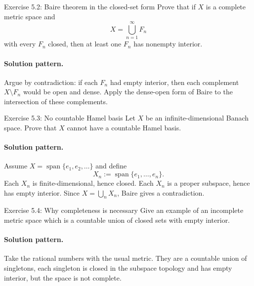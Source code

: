 \documentclass[header={Lecture 5 Exam Study Notes}]{study-note}
\begin{document}
\begin{exbox}{Exercise 5.2: Baire theorem in the closed-set form}
Prove that if $X$ is a complete metric space and
\[
X=\bigcup_{n=1}^{\infty}F_n
\]
with every $F_n$ closed, then at least one $F_n$ has nonempty interior.

\paragraph{Solution pattern.}
Argue by contradiction: if each $F_n$ had empty interior, then each complement $X\setminus F_n$ would be open and dense. Apply the dense-open form of Baire to the intersection of these complements.
\end{exbox}

\begin{exbox}{Exercise 5.3: No countable Hamel basis}
Let $X$ be an infinite-dimensional Banach space. Prove that $X$ cannot have a countable Hamel basis.

\paragraph{Solution pattern.}
Assume $X=\operatorname{span}\{e_1,e_2,\dots\}$ and define
\[
X_n:=\operatorname{span}\{e_1,\dots,e_n\}.
\]
Each $X_n$ is finite-dimensional, hence closed. Each $X_n$ is a proper subspace, hence has empty interior. Since $X=\bigcup_n X_n$, Baire gives a contradiction.
\end{exbox}

\begin{exbox}{Exercise 5.4: Why completeness is necessary}
Give an example of an incomplete metric space which is a countable union of closed sets with empty interior.

\paragraph{Solution pattern.}
Take the rational numbers with the usual metric. They are a countable union of singletons, each singleton is closed in the subspace topology and has empty interior, but the space is not complete.
\end{exbox}
\end{document}
